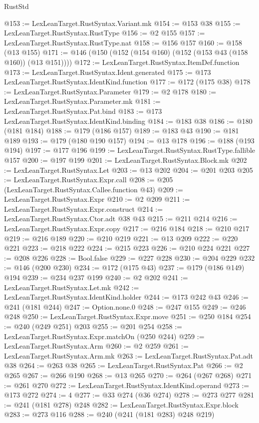 \begin{lexlean}{RustStd}
\begin{coremodule}
{\begin{coremodule}
{{{{{{@153 := LexLeanTarget.RustSyntax.Variant.mk
@154 := @153 @38
@155 := LexLeanTarget.RustSyntax.RustType
@156 := @2 @155
@157 := LexLeanTarget.RustSyntax.RustType.nat
@158 := @156 @157
@160 := @158 (@13 @155)
@171 := @146 (@150 (@152 (@154 @160) (@152 (@153 @43 (@158 @160)) (@13 @151))))
@172 := LexLeanTarget.RustSyntax.ItemDef.function
@173 := LexLeanTarget.RustSyntax.Ident.generated
@175 := @173 LexLeanTarget.RustSyntax.IdentKind.function
@177 := @172 (@175 @38)
@178 := LexLeanTarget.RustSyntax.Parameter
@179 := @2 @178
@180 := LexLeanTarget.RustSyntax.Parameter.mk
@181 := LexLeanTarget.RustSyntax.Pat.bind
@183 := @173 LexLeanTarget.RustSyntax.IdentKind.binding
@184 := @183 @38
@186 := @180 (@181 @184)
@188 := @179 (@186 @157)
@189 := @183 @43
@190 := @181 @189
@193 := @179 (@180 @190 @157)
@194 := @13 @178
@196 := @188 (@193 @194)
@197 := @177 @196
@199 := LexLeanTarget.RustSyntax.RustType.fallible @157
@200 := @197 @199
@201 := LexLeanTarget.RustSyntax.Block.mk
@202 := LexLeanTarget.RustSyntax.Let
@203 := @13 @202
@204 := @201 @203
@205 := LexLeanTarget.RustSyntax.Expr.call
@208 := @205 (LexLeanTarget.RustSyntax.Callee.function @43)
@209 := LexLeanTarget.RustSyntax.Expr
@210 := @2 @209
@211 := LexLeanTarget.RustSyntax.Expr.construct
@214 := LexLeanTarget.RustSyntax.Ctor.adt @38 @43
@215 := @211 @214
@216 := LexLeanTarget.RustSyntax.Expr.copy
@217 := @216 @184
@218 := @210 @217
@219 := @216 @189
@220 := @210 @219
@221 := @13 @209
@222 := @220 @221
@223 := @218 @222
@224 := @215 @223
@226 := @210 @224 @221
@227 := @208 @226
@228 := Bool.false
@229 := @227 @228
@230 := @204 @229
@232 := @146 (@200 @230)
@234 := @172 (@175 @43)
@237 := @179 (@186 @149) @194
@239 := @234 @237 @199
@240 := @2 @202
@241 := LexLeanTarget.RustSyntax.Let.mk
@242 := LexLeanTarget.RustSyntax.IdentKind.holder
@244 := @173 @242 @43
@246 := @241 (@181 @244)
@247 := Option.none.{0}
@248 := @247 @155
@249 := @246 @248
@250 := LexLeanTarget.RustSyntax.Expr.move
@251 := @250 @184
@254 := @240 (@249 @251) @203
@255 := @201 @254
@258 := LexLeanTarget.RustSyntax.Expr.matchOn (@250 @244)
@259 := LexLeanTarget.RustSyntax.Arm
@260 := @2 @259
@261 := LexLeanTarget.RustSyntax.Arm.mk
@263 := LexLeanTarget.RustSyntax.Pat.adt @38
@264 := @263 @38
@265 := LexLeanTarget.RustSyntax.Pat
@266 := @2 @265
@267 := @266 @190
@268 := @13 @265
@270 := @264 (@267 @268)
@271 := @261 @270
@272 := LexLeanTarget.RustSyntax.IdentKind.operand
@273 := @173 @272
@274 := 4
@277 := @33 @274 (@36 @274)
@278 := @273 @277
@281 := @241 (@181 @278) @248
@282 := LexLeanTarget.RustSyntax.Expr.block
@283 := @273 @116
@288 := @240 (@241 (@181 @283) @248 @219)
}}}}}}
\end{coremodule}}
\end{coremodule}
\end{lexlean}
